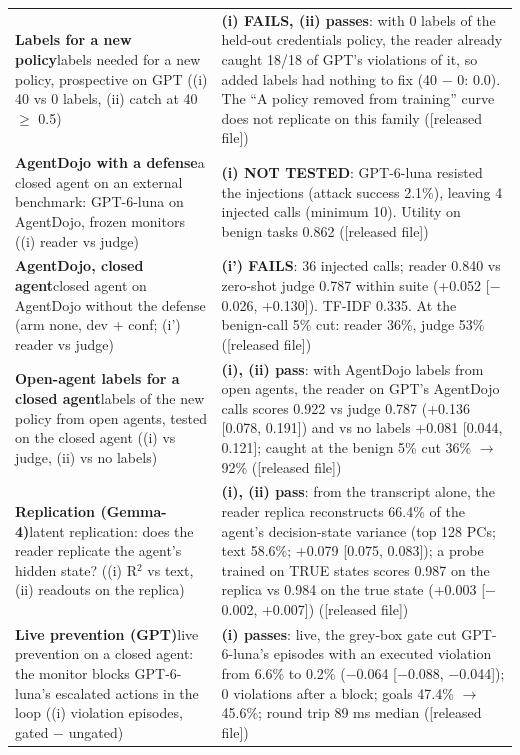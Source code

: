 {\begin{longtable}{p{}p{}}
\textbf{Labels for a new policy}\newline labels needed for a new policy, prospective on GPT ((i) 40 vs 0 labels, (ii) catch at 40 $\geq$ 0.5) & \textbf{(i) FAILS, (ii) passes}: with 0 labels of the held-out credentials policy, the reader already caught 18/18 of GPT's violations of it, so added labels had nothing to fix (40 $-$ 0: 0.0). The ``A policy removed from training'' curve does not replicate on this family ([released file])\\[2pt]
\textbf{AgentDojo with a defense}\newline a closed agent on an external benchmark: GPT-6-luna on AgentDojo, frozen monitors ((i) reader vs judge) & \textbf{(i) NOT TESTED}: GPT-6-luna resisted the injections (attack success 2.1\%), leaving 4 injected calls (minimum 10). Utility on benign tasks 0.862 ([released file])\\[2pt]
\textbf{AgentDojo, closed agent}\newline closed agent on AgentDojo without the defense (arm none, dev + conf; (i') reader vs judge) & \textbf{(i') FAILS}: 36 injected calls; reader 0.840 vs zero-shot judge 0.787 within suite (+0.052 [$-$0.026, +0.130]). TF-IDF 0.335. At the benign-call 5\% cut: reader 36\%, judge 53\% ([released file])\\[2pt]
\textbf{Open-agent labels for a closed agent}\newline labels of the new policy from open agents, tested on the closed agent ((i) vs judge, (ii) vs no labels) & \textbf{(i), (ii) pass}: with AgentDojo labels from open agents, the reader on GPT's AgentDojo calls scores 0.922 vs judge 0.787 (+0.136 [0.078, 0.191]) and vs no labels +0.081 [0.044, 0.121]; caught at the benign 5\% cut 36\% $\rightarrow$ 92\% ([released file])\\[2pt]
\textbf{Replication (Gemma-4)}\newline latent replication: does the reader replicate the agent's hidden state? ((i) R$^2$ vs text, (ii) readouts on the replica) & \textbf{(i), (ii) pass}: from the transcript alone, the reader replica reconstructs 66.4\% of the agent's decision-state variance (top 128 PCs; text 58.6\%; +0.079 [0.075, 0.083]); a probe trained on TRUE states scores 0.987 on the replica vs 0.984 on the true state (+0.003 [$-$0.002, +0.007]) ([released file])\\[2pt]
\textbf{Live prevention (GPT)}\newline live prevention on a closed agent: the monitor blocks GPT-6-luna's escalated actions in the loop ((i) violation episodes, gated $-$ ungated) & \textbf{(i) passes}: live, the grey-box gate cut GPT-6-luna's episodes with an executed violation from 6.6\% to 0.2\% ($-$0.064 [$-$0.088, $-$0.044]); 0 violations after a block; goals 47.4\% $\rightarrow$ 45.6\%; round trip 89 ms median ([released file])\\[2pt]

\end{longtable}}
